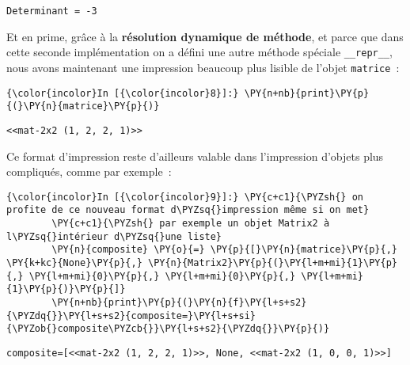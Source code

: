     \begin{Verbatim}[commandchars=\\\{\},frame=single,framerule=0.3mm,rulecolor=\color{cellframecolor}]
Determinant = -3
\end{Verbatim}

    Et en prime, grâce à la \textbf{résolution dynamique de méthode}, et
parce que dans cette seconde implémentation on a défini une autre
méthode spéciale \texttt{\_\_repr\_\_}, nous avons maintenant une
impression beaucoup plus lisible de l'objet \texttt{matrice}~:

    \begin{Verbatim}[commandchars=\\\{\},frame=single,framerule=0.3mm,rulecolor=\color{cellframecolor}]
{\color{incolor}In [{\color{incolor}8}]:} \PY{n+nb}{print}\PY{p}{(}\PY{n}{matrice}\PY{p}{)}
\end{Verbatim}


    \begin{Verbatim}[commandchars=\\\{\},frame=single,framerule=0.3mm,rulecolor=\color{cellframecolor}]
<<mat-2x2 (1, 2, 2, 1)>>
\end{Verbatim}

    Ce format d'impression reste d'ailleurs valable dans l'impression
d'objets plus compliqués, comme par exemple~:

    \begin{Verbatim}[commandchars=\\\{\},frame=single,framerule=0.3mm,rulecolor=\color{cellframecolor}]
{\color{incolor}In [{\color{incolor}9}]:} \PY{c+c1}{\PYZsh{} on profite de ce nouveau format d\PYZsq{}impression même si on met}
        \PY{c+c1}{\PYZsh{} par exemple un objet Matrix2 à l\PYZsq{}intérieur d\PYZsq{}une liste}
        \PY{n}{composite} \PY{o}{=} \PY{p}{[}\PY{n}{matrice}\PY{p}{,} \PY{k+kc}{None}\PY{p}{,} \PY{n}{Matrix2}\PY{p}{(}\PY{l+m+mi}{1}\PY{p}{,} \PY{l+m+mi}{0}\PY{p}{,} \PY{l+m+mi}{0}\PY{p}{,} \PY{l+m+mi}{1}\PY{p}{)}\PY{p}{]}
        \PY{n+nb}{print}\PY{p}{(}\PY{n}{f}\PY{l+s+s2}{\PYZdq{}}\PY{l+s+s2}{composite=}\PY{l+s+si}{\PYZob{}composite\PYZcb{}}\PY{l+s+s2}{\PYZdq{}}\PY{p}{)}
\end{Verbatim}


    \begin{Verbatim}[commandchars=\\\{\},frame=single,framerule=0.3mm,rulecolor=\color{cellframecolor}]
composite=[<<mat-2x2 (1, 2, 2, 1)>>, None, <<mat-2x2 (1, 0, 0, 1)>>]
\end{Verbatim}

